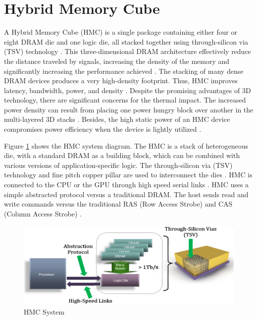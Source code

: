 \documentclass{sig-alternate-05-2015}
\begin{document}
\section{Hybrid Memory Cube} \label{sec:Hybrid-Memory-Cube}

A Hybrid Memory Cube (HMC) is a single package containing either four or eight DRAM die and one logic die, all stacked together using through-silicon via (TSV) technology \cite{hmc2_1_Specification}. This three-dimensional DRAM architecture effectively reduce the distance traveled by signals, increasing the density of the memory and significantly increasing the performance achieved \cite{suresh2014evaluation}. The stacking
of many dense DRAM devices produces a very high-density footprint. Thus, HMC improves latency, bandwidth, power, and density \cite{jeddeloh2012HMC}. Despite the promising advantages of 3D technology, there are significant concerns for the thermal impact. The increased power density can result from placing one power hungry block over another in the multi-layered 3D stacks \cite{zhang2014survey}. Besides, the high static power of an HMC device compromises power efficiency when the device is lightly utilized \cite{wang2015enabling}.

Figure \ref{fig:HMC-System} shows the HMC system diagram. The HMC is a stack of heterogeneous die, with a standard DRAM as a building block, which can be combined with various versions of application-specific logic. The through-silicon via (TSV) technology and fine pitch copper pillar are used to interconnect the dies \cite{jeddeloh2012HMC}. HMC is connected to the CPU or the GPU through high speed serial links
\cite{jeon2017cashmc}. HMC uses a simple abstracted protocol versus a traditional DRAM. The host sends read and write commands versus the traditional RAS (Row Access Strobe) and CAS (Column Access Strobe) \cite{jeddeloh2012HMC}.

\begin{figure}
	\centering
\includegraphics[scale=0.18]{images/HMC_SystemDiagram}
\caption{\label{fig:HMC-System}HMC System \cite{jeddeloh2012HMC}}
\end{figure}
\end{document}
